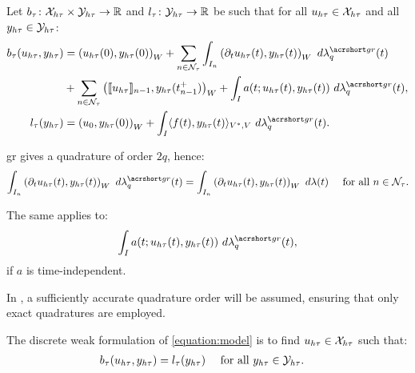 \begin{definition}
    Let $b_{\tau} \colon \mathcal{X}_{h \tau} \times \mathcal{Y}_{h \tau} \rightarrow \mathbb{R}$ and $l_{\tau} \colon \mathcal{Y}_{h \tau} \rightarrow \mathbb{R}$ be such that for all $u_{h \tau} \in \mathcal{X}_{h \tau}$ and all $y_{h \tau} \in \mathcal{Y}_{h \tau}$:
    \begin{align}
        b_{\tau}(u_{h \tau}, y_{h \tau}) & = \left( u_{h \tau}(0), y_{h \tau}(0) \right)_W + \sum_{n \in \TimeIndices} \int_{I_n} \left( \partial_t u_{h \tau}(t), y_{h \tau}(t) \right)_W ~ d \lambdaGR_q(t) \\
        & + \sum_{n \in \TimeIndices} \left( \llbracket u_{h \tau} \rrbracket_{n - 1}, y_{h \tau}(t_{n - 1}^+) \right)_W + \int_I a(t; u_{h \tau}(t), y_{h \tau}(t)) ~ d \lambdaGR_q(t), \notag \\
        l_{\tau}(y_{h \tau}) & = \left( u_0, y_{h \tau}(0) \right)_W + \int_I \langle f(t), y_{h \tau}(t) \rangle_{V^*, V} ~ d \lambdaGR_q(t).
    \end{align}
\end{definition}

\begin{remark}
    \acrshort{gr} gives a quadrature of order $2q$, hence:
    \begin{align}
        \int_{I_n} \left( \partial_t u_{h \tau}(t), y_{h \tau}(t) \right)_W ~ d \lambdaGR_q(t) &= \int_{I_n} \left( \partial_t u_{h \tau}(t), y_{h \tau}(t) \right)_W ~ d \lambda(t) &\text{ for all } n \in \TimeIndices.
    \end{align}
    
    The same applies to:
    \begin{align}
        \int_I a(t; u_{h \tau}(t), y_{h \tau}(t)) ~ d \lambdaGR_q(t),
    \end{align}
    if $a$ is time-independent.
\end{remark}
In , a sufficiently accurate quadrature order will be assumed, ensuring that only exact quadratures are employed.

\begin{definition}
    The discrete weak formulation of \cref{equation:model} is to find $u_{h \tau} \in \mathcal{X}_{h \tau}$ such that:
    \begin{align} \label{equation:weak_ht}
        b_{\tau}(u_{h \tau}, y_{h \tau}) &= l_{\tau}(y_{h \tau}) &\text{ for all } y_{h \tau} \in \mathcal{Y}_{h \tau}.
&    \end{align}
\end{definition}


